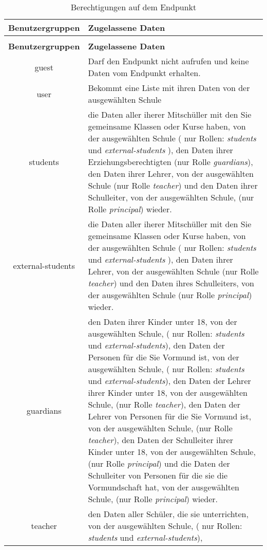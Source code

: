 \begin{longtable}{|c|p{}|}
		\caption{Berechtigungen auf dem Endpunkt}
		\label{tab:rest:api:school:users:id:read:right} \\
\hline
\textbf{Benutzergruppen} & \textbf{Zugelassene Daten} \\ \hline
\endfirsthead
\caption{Berechtigungen auf dem Endpunkt}\\
\hline
\textbf{Benutzergruppen} & \textbf{Zugelassene Daten} \\ \hline
\endhead
guest & Darf den Endpunkt nicht aufrufen und keine Daten vom Endpunkt erhalten. \\ \hline
user & Bekommt eine Liste mit ihren Daten von der ausgewählten Schule \\ \hline 
students & die Daten aller iherer Mitschüller mit den Sie gemeinsame Klassen oder Kurse haben, von der ausgewählten Schule ( nur Rollen: \textit{students} und \textit{external-students} ),
           den Daten ihrer Erziehungsberechtigten (nur Rolle \textit{guardians}), 
					 den Daten ihrer Lehrer, von der ausgewählten Schule (nur Rolle \textit{teacher}) und 
					 den Daten ihrer Schulleiter, von der ausgewählten Schule, (nur Rolle \textit{principal}) wieder.\\ \hline
external-students &  die Daten aller iherer Mitschüller mit den Sie gemeinsame Klassen oder Kurse haben, von der ausgewählten Schule ( nur Rollen: \textit{students} und \textit{external-students} ),
           den Daten ihrer Lehrer, von der ausgewählten Schule (nur Rolle \textit{teacher}) und 
					 den Daten ihres Schulleiters, von der ausgewählten Schule (nur Rolle \textit{principal}) wieder.\\ \hline
guardians & den Daten ihrer Kinder unter 18, von der ausgewählten Schule, ( nur Rollen: \textit{students} und \textit{external-students}), 
					den Daten der Personen für die Sie Vormund ist, von der ausgewählten Schule, ( nur Rollen: \textit{students} und \textit{external-students}), 
					den Daten der Lehrer ihrer Kinder unter 18, von der ausgewählten Schule, (nur Rolle \textit{teacher}),
					den Daten der Lehrer von Personen für die Sie Vormund ist, von der ausgewählten Schule, (nur Rolle \textit{teacher}),
					den Daten der Schulleiter ihrer Kinder unter 18, von der ausgewählten Schule, (nur Rolle \textit{principal}) und
					die Daten der Schulleiter von Personen für die sie die Vormundschaft hat, von der ausgewählten Schule, (nur Rolle \textit{principal})
					wieder.\\ \hline
teacher & den Daten aller Schüler, die sie unterrichten, von der ausgewählten Schule, ( nur Rollen: \textit{students} und \textit{external-students}),

\end{longtable}
